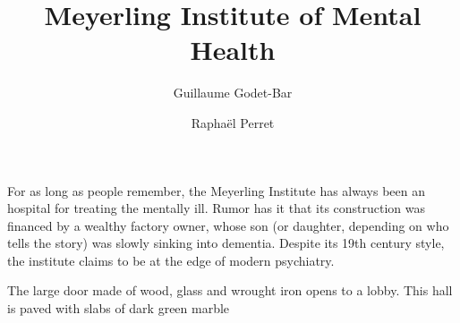 \documentclass{rpg_location}
\title{Meyerling Institute of Mental Health}
\begin{document}
\author{Guillaume Godet-Bar \and Rapha\"el Perret}
\maketitle


For as long as people remember, the Meyerling Institute has always been an
hospital for treating the mentally ill. Rumor has it that its construction was
financed by a wealthy factory owner, whose son (or daughter, depending on who
tells the story) was slowly sinking into dementia. Despite its 19th century
style, the institute claims to be at the edge of modern psychiatry.

The large door made of wood, glass and wrought iron opens to a lobby. This hall is paved with slabs of dark green marble
\end{document}
